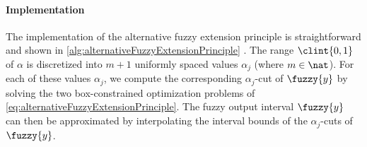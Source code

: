 \paragraph{Implementation}

The implementation of the alternative fuzzy extension principle
is straightforward and shown in \cref{alg:alternativeFuzzyExtensionPrinciple}
\cite{Klimke06Uncertainty}.
The range $\clint{0, 1}$ of $\alpha$
is discretized into $m + 1$ uniformly spaced values $\alpha_j$
(where $m \in \nat$).
For each of these values $\alpha_j$, we compute the corresponding
$\alpha_j$-cut of $\fuzzy{y}$ by solving the two box-constrained
optimization problems of \cref{eq:alternativeFuzzyExtensionPrinciple}.
The fuzzy output interval $\fuzzy{y}$ can then be approximated by
interpolating the interval bounds of the $\alpha_j$-cuts of $\fuzzy{y}$.

%  
%  

